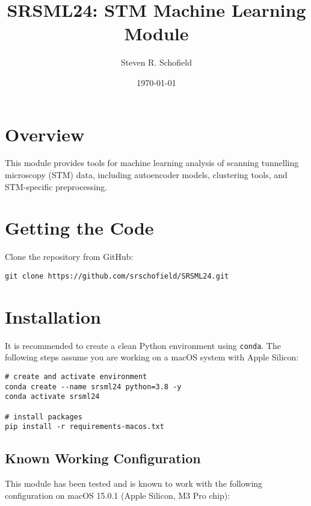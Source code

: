 \documentclass[11pt]{article}
\title{SRSML24: STM Machine Learning Module}
\author{Steven R. Schofield}
\date{\today}
\begin{document}
\maketitle

\section*{Overview}
This module provides tools for machine learning analysis of scanning tunnelling microscopy (STM) data, including autoencoder models, clustering tools, and STM-specific preprocessing.

\section*{Getting the Code}
Clone the repository from GitHub:

\begin{verbatim}
git clone https://github.com/srschofield/SRSML24.git
\end{verbatim}

\section*{Installation}
It is recommended to create a clean Python environment using \texttt{conda}. The following steps assume you are working on a macOS system with Apple Silicon:

\begin{verbatim}
# create and activate environment
conda create --name srsml24 python=3.8 -y
conda activate srsml24

# install packages
pip install -r requirements-macos.txt
\end{verbatim}

\subsection*{Known Working Configuration}
This module has been tested and is known to work with the following configuration on macOS 15.0.1 (Apple Silicon, M3 Pro chip):
\end{document}

